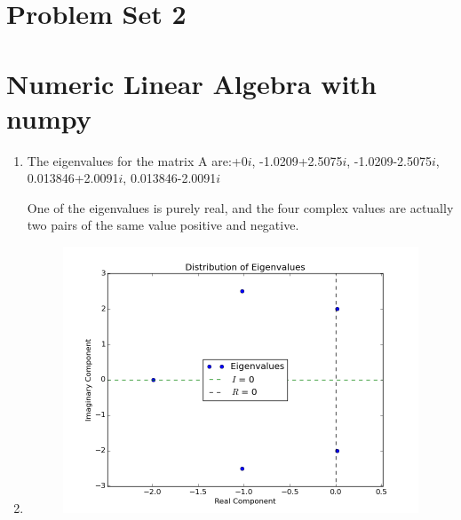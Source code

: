 \documentclass[12pt, preprint]{aastex}
\begin{document}
\section*{Problem Set 2}
\section*{Numeric Linear Algebra with numpy}
\begin{enumerate}
\item The eigenvalues for the matrix A are:+0$i$, -1.0209+2.5075$i$, -1.0209-2.5075$i$, 0.013846+2.0091$i$, 0.013846-2.0091$i$

One of the eigenvalues is purely real, and the four complex values are actually two pairs of the same value positive and negative.

\item 
\begin{figure}[!ht]
\centering
\includegraphics[width=5in]{hw2.png}
\end{figure}
\end{enumerate}
\end{document}
